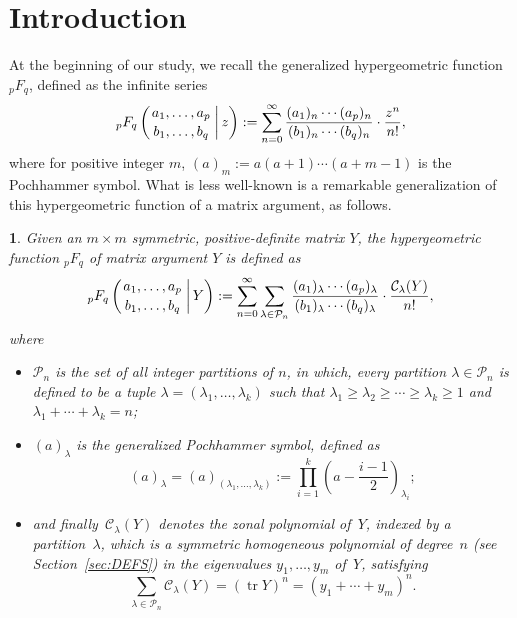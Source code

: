 \documentclass[smallextended]{svjour3}
\newtheorem{defn}[thm]{\protect\definitionname}
\DeclareMathOperator{\Tr}{tr}
\providecommand{\definitionname}{Definition}
\begin{document}
\section{Introduction}
At the beginning of our study, we recall the generalized hypergeometric
function ${}_pF_q$, defined as the infinite series
\begin{equation}\label{eq:pFq}
  {}_pF_q\left(\genfrac{}{}{0pt}{}{a_{1},\ldots,a_{p}}{b_{1},\ldots,b_{q}}\,\bigg|\,z\right) :=
  \sum_{n=0}^{\infty}\frac{(a_{1})_{n}\cdots(a_{p})_{n}}{(b_{1})_{n}\cdots(b_{q})_{n}}\cdot\frac{z^{n}}{n!},
\end{equation}
where for positive integer $m$,
$(a)_{m}:=a(a+1)\cdots(a+m-1)$ is the
Pochhammer symbol.  What is less well-known is a remarkable generalization of
this hypergeometric function of a matrix argument, as follows.
\begin{defn}
Given an $m\times m$ symmetric, positive-definite matrix $Y$, the
hypergeometric function ${}_pF_q$ of matrix argument $Y$ is defined as 
\begin{equation}\label{eq:MatrixpFq}
  {}_{p}F_{q}\left(\genfrac{}{}{0pt}{}{a_{1},\ldots,a_{p}}{b_{1},\ldots,b_{q}}\,\bigg|\,Y\right) :=
  \sum_{n=0}^{\infty}\sum_{\lambda\in\mathcal{P}_{n}}\frac{(a_{1})_{\lambda}\cdots(a_{p})_{\lambda}}
      {(b_{1})_{\lambda}\cdots(b_{q})_{\lambda}}\cdot\frac{\mathcal{C}_{\lambda}(Y)}{n!},
\end{equation}
where 
\begin{itemize}
\item $\mathcal{P}_{n}$ is the set of all integer partitions of $n$, in which,
every partition $\lambda\in\mathcal{P}_{n}$ is defined to be a tuple
$\lambda=(\lambda_{1},\ldots,\lambda_{k})$ such that 
$\lambda_{1}\geq\lambda_{2}\geq\cdots\geq\lambda_{k}\geq 1$ and 
$ \lambda_{1}+\cdots+\lambda_{k}=n$;
\item $(a)_{\lambda}$ is the generalized Pochhammer symbol, defined as
\[
(a)_{\lambda}=(a)_{(\lambda_{1},\dots,\lambda_{k})}:=\prod_{i=1}^{k}\left(a-\frac{i-1}{2}\right)_{\!\!\lambda_{i}}\!\!;
\]
\item and finally~$\mathcal{C}_{\lambda}(Y)$ denotes the zonal polynomial
of~$Y$, indexed by a partition~$\lambda$, which is a symmetric homogeneous polynomial
of degree~$n$ (see Section~\ref{sec:DEFS}) in the eigenvalues
$y_{1},\ldots,y_{m}$ of~$Y$, satisfying 
\begin{equation}\label{eq:TrZonal}
  \sum_{\lambda\in\mathcal{P}_{n}}\mathcal{C}_{\lambda}(Y)=(\Tr Y)^{n}=(y_{1}+\cdots+y_{m})^{n}.
\end{equation}
\end{itemize}
\end{defn}
\end{document}

